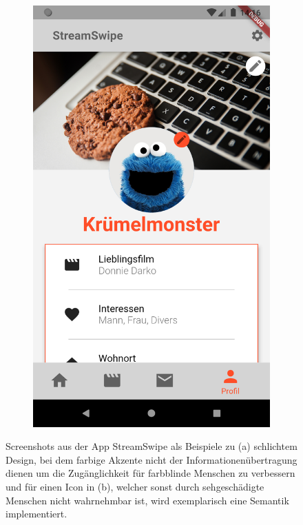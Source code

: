 \begin{figure}[tbt]
\begin{subfigure}{0.5\textwidth}
	\includegraphics[scale=0.15]{Barrierefreiheit/images/bsp-profil.png}
	\caption{}
	\label{fig:bf-beispiel_b}
	\end{subfigure}
\caption[Screenshots als Beispiele für Barrierefreiheit]{Screenshots aus der App StreamSwipe als Beispiele zu (a) schlichtem Design, bei dem farbige Akzente nicht der Informationenübertragung dienen um die Zugänglichkeit für farbblinde Menschen zu verbessern und für einen Icon in (b), welcher sonst durch sehgeschädigte Menschen nicht wahrnehmbar ist, wird exemplarisch eine Semantik implementiert.}
\label{fig:BF-Beispiele}
\end{figure}



